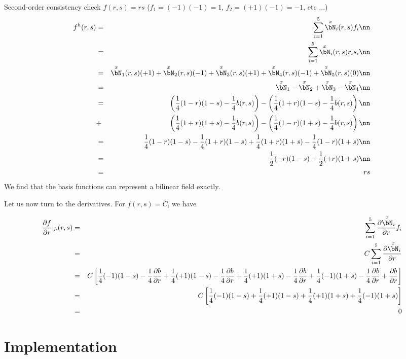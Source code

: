 Second-order consistency check $f(r,s)=rs$ ($f_1=(-1)(-1)=1$, $f_2=(+1)(-1)=-1$, etc ...)
\begin{eqnarray}
f^h(r,s) 
&=& \sum_{i=1}^5 \overset{x}{\bN}_i(r,s) f_i \nn\\
&=& \sum_{i=1}^5 \overset{x}{\bN}_i(r,s) r_i s_i \nn\\
&=& \overset{x}{\bN}_1(r,s) (+1) + \overset{x}{\bN}_2(r,s) (-1) + \overset{x}{\bN}_3(r,s) (+1) + \overset{x}{\bN}_4(r,s) (-1) + \overset{x}{\bN}_5(r,s) (0) \nn\\
&=& \overset{x}{\bN}_1-\overset{x}{\bN}_2+\overset{x}{\bN}_3-\overset{x}{\bN}_4 \nn\\
&=& 
\left(\frac{1}{4}(1-r)(1-s)-\frac{1}{4}b(r,s)\right)
-\left(\frac{1}{4}(1+r)(1-s)-\frac{1}{4}b(r,s)\right) \nn\\
&+& 
\left(\frac{1}{4}(1+r)(1+s)-\frac{1}{4}b(r,s)\right)
-\left(\frac{1}{4}(1-r)(1+s)-\frac{1}{4}b(r,s)\right) \nn\\
&=& 
 \frac{1}{4}(1-r)(1-s)
-\frac{1}{4}(1+r)(1-s)
+\frac{1}{4}(1+r)(1+s)
-\frac{1}{4}(1-r)(1+s) \nn\\
&=&
 \frac{1}{2}(-r)(1-s)
+\frac{1}{2}(+r)(1+s) \nn\\
&=& rs
\end{eqnarray}
We find that the basis functions can represent  a bilinear field exactly.

Let us now turn to the derivatives. 
For $f(r,s)=C$, we have

\begin{eqnarray}
\frac{\partial f}{\partial r}|_h(r,s) 
&=& \sum_{i=1}^5 \frac{\partial \overset{x}{\bN}_i}{\partial r} f_i \\ 
&=& C \sum_{i=1}^5 \frac{\partial \overset{x}{\bN}_i}{\partial r} \\
&=&  C \left[ 
\frac14(-1)(1-s) -\frac14 \frac{\partial b}{\partial r} + 
\frac14(+1)(1-s) -\frac14 \frac{\partial b}{\partial r} + 
\frac14(+1)(1+s) -\frac14 \frac{\partial b}{\partial r} + 
\frac14(-1)(1+s) -\frac14 \frac{\partial b}{\partial r} + 
\frac{\partial b}{\partial r} \right] \\
&=& C \left[ 
\frac14(-1)(1-s)  + 
\frac14(+1)(1-s)  + 
\frac14(+1)(1+s)  + 
\frac14(-1)(1+s)   \right] \\
&=& 0
\end{eqnarray}




\section*{Implementation}

